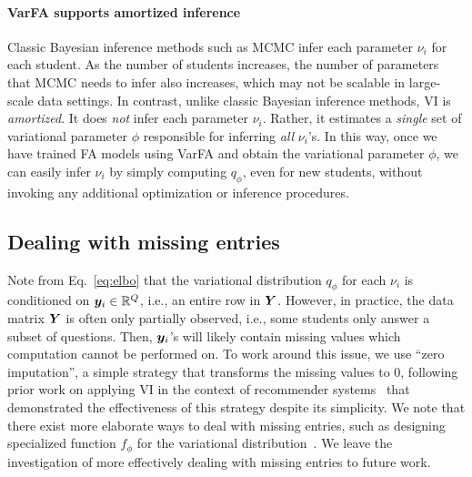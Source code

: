 \documentclass{edm_article}
\begin{document}
\vspace{-10pt}
\paragraph{VarFA supports amortized inference} Classic Bayesian inference methods such as MCMC infer each parameter $\nu_i$ for each student. As the number of students increases, the number of parameters that MCMC needs to infer also increases, which may not be scalable in large-scale data settings. In contrast, unlike classic Bayesian inference methods, VI is \textit{amortized}. It does \textit{not} infer each parameter $\nu_i$. Rather, it estimates a \textit{single} set of variational parameter $\phi$ responsible for inferring \textit{all} $\nu_i$'s. In this way, once we have trained FA models using VarFA and obtain the variational parameter $\phi$, we can easily infer $\nu_i$ by simply computing $q_\phi$, even for new students, without invoking any additional optimization or inference procedures. 

\subsection{Dealing with missing entries} Note from Eq.~\ref{eq:elbo} that the variational distribution $q_\phi$ for each $\nu_i$ is conditioned on ${\bm{y}}_i\in\mathbb{R}^Q$, i.e., an entire row in ${\bm{Y}}$. However, in practice, the data matrix ${\bm{Y}}$ is often only partially observed, i.e., some students only answer a subset of questions. Then, ${\bm{y}}_i$'s will likely contain missing values which computation cannot be performed on. To work around this issue, we use ``zero imputation'', a simple strategy that transforms the missing values to 0, following prior work on applying VI in the context of recommender systems~\cite{liang2018variational,salakhutdinov2007restricted,sedhain2015autorec,nazabal2018handling} that demonstrated the effectiveness of this strategy despite its simplicity. We note that there exist more elaborate ways to deal with missing entries, such as designing specialized function $f_\phi$ for the variational distribution~\cite{ma2018eddi,gong2019icebreaker,ma2018partial}. We leave the investigation of more effectively dealing with missing entries to future work.
\end{document}
